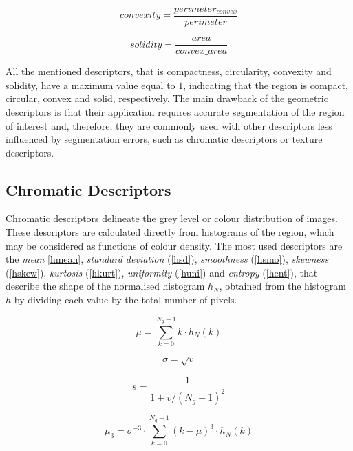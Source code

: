 \documentclass[final,a4paper,12pt,english]{UnicaPhdThesis3}
\begin{document}
	\begin{equation}\label{convexity}
	convexity=\frac{perimeter_{convex}}{perimeter}
	\end{equation}
	
	\begin{equation}\label{solidity}
	solidity=\frac{area}{convex\_area}
	\end{equation}
	
	All the mentioned descriptors, that is compactness, circularity, convexity and solidity, have a maximum value equal to $1$, indicating that the region is compact, circular, convex and solid, respectively.  The main drawback of the geometric descriptors is that their application requires accurate segmentation of the region of interest and, therefore, they are commonly used with other descriptors less influenced by segmentation errors, such as chromatic descriptors or texture descriptors.
	
	\subsection{Chromatic Descriptors} %
	Chromatic descriptors delineate the grey level or colour distribution of images. These descriptors are calculated directly from histograms of the region, which may be considered as functions of colour density. The most used descriptors are the \textit{mean} \ref{hmean},  \textit{standard deviation} (\ref{hsd}), \textit{smoothness} (\ref{hsmo}), \textit{skewness} (\ref{hskew}), \textit{kurtosis} (\ref{hkurt}), \textit{uniformity} (\ref{huni}) and \textit{entropy} (\ref{hent}), that describe the shape of the normalised histogram $h_N$, obtained from the histogram $h$ by dividing each value by the total number of pixels.
	
	\begin{equation}\label{hmean}
	\mu=\sum_{k=0}^{N_{g}-1} k\cdot h_N(k)
	\end{equation}
	
	\begin{equation}\label{hsd}
	\sigma=\sqrt{v}
	\end{equation}
	
	\begin{equation}\label{hsmo}
	s=\frac{1}{1 + v/(N_{g}-1)^2 }
	\end{equation}
	
	\begin{equation}\label{hskew}
	\mu_3=\sigma^{-3} \cdot \sum_{k=0}^{N_{g}-1} (k - \mu)^3 \cdot h_N(k)
	\end{equation}
	
\end{document}

